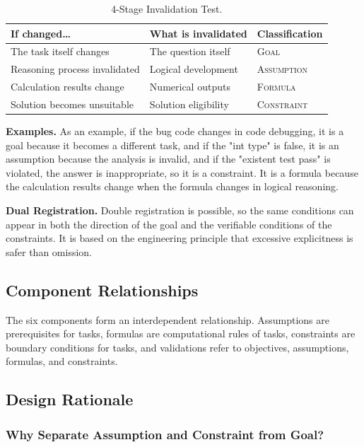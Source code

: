 \documentclass[11pt,a4paper]{article}
\begin{document}
\begin{table}[h]
\centering
\caption{4-Stage Invalidation Test.}
\label{tab:invalidation}
\begin{tabular}{lll}
\toprule
\textbf{If changed\ldots} & \textbf{What is invalidated} & \textbf{Classification} \\
\midrule
The task itself changes & The question itself & \textsc{Goal} \\
Reasoning process invalidated & Logical development & \textsc{Assumption} \\
Calculation results change & Numerical outputs & \textsc{Formula} \\
Solution becomes unsuitable & Solution eligibility & \textsc{Constraint} \\
\bottomrule
\end{tabular}
\end{table}

\textbf{Examples.} As an example, if the bug code changes in code debugging, it is a goal because it becomes a different task, and if the "int type" is false, it is an assumption because the analysis is invalid, and if the "existent test pass" is violated, the answer is inappropriate, so it is a constraint. It is a formula because the calculation results change when the formula changes in logical reasoning.

\textbf{Dual Registration.} Double registration is possible, so the same conditions can appear in both the direction of the goal and the verifiable conditions of the constraints. It is based on the engineering principle that excessive explicitness is safer than omission.

\subsection{Component Relationships}

The six components form an interdependent relationship. Assumptions are prerequisites for tasks, formulas are computational rules of tasks, constraints are boundary conditions for tasks, and validations refer to objectives, assumptions, formulas, and constraints.

\subsection{Design Rationale}

\subsubsection{Why Separate Assumption and Constraint from Goal?}
\end{document}
